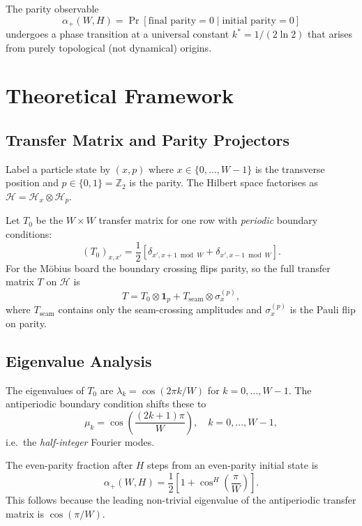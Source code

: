 \documentclass[12pt,a4paper]{article}
\newcommand{\kstar}{k^*}
\newcommand{\alphap}{\alpha_+}
\newcommand{\ZZ}{\mathbb{Z}}
\begin{document}
The parity observable
\[
  \alphap(W,H) = \Pr[\text{final parity} = 0 \mid \text{initial parity} = 0]
\]
undergoes a phase transition at a universal constant $\kstar = 1/(2\ln 2)$
that arises from purely topological (not dynamical) origins.

\section{Theoretical Framework}
\label{sec:theory}

\subsection{Transfer Matrix and Parity Projectors}

Label a particle state by $(x, p)$ where $x \in \{0,\ldots,W-1\}$ is the
transverse position and $p \in \{0,1\} = \ZZ_2$ is the parity. The Hilbert
space factorises as $\mathcal{H} = \mathcal{H}_x \otimes \mathcal{H}_p$.

Let $T_0$ be the $W\times W$ transfer matrix for one row with
\emph{periodic} boundary conditions:
\[
  (T_0)_{x,x'} = \frac{1}{2}\left[\delta_{x', x+1 \bmod W}
                                 + \delta_{x', x-1 \bmod W}\right].
\]
For the Möbius board the boundary crossing flips parity, so the full
transfer matrix $T$ on $\mathcal{H}$ is
\[
  T = T_0 \otimes \mathbf{1}_p
    + T_{\mathrm{seam}} \otimes \sigma_x^{(p)},
\]
where $T_{\mathrm{seam}}$ contains only the seam-crossing amplitudes and
$\sigma_x^{(p)}$ is the Pauli flip on parity.

\subsection{Eigenvalue Analysis}

The eigenvalues of $T_0$ are $\lambda_k = \cos(2\pi k/W)$ for
$k = 0,\ldots,W-1$. The antiperiodic boundary condition shifts these to
\[
  \mu_k = \cos\!\left(\frac{(2k+1)\pi}{W}\right), \quad k=0,\ldots,W-1,
\]
i.e.\ the \emph{half-integer} Fourier modes.

The even-parity fraction after $H$ steps from an even-parity initial
state is
\begin{equation}\label{eq:alpha}
  \boxed{\alphap(W,H) = \frac{1}{2}\!\left[1 + \cos^H\!\!\left(\frac{\pi}{W}\right)\right].}
\end{equation}
This follows because the leading non-trivial eigenvalue of the
antiperiodic transfer matrix is $\cos(\pi/W)$.
\end{document}
